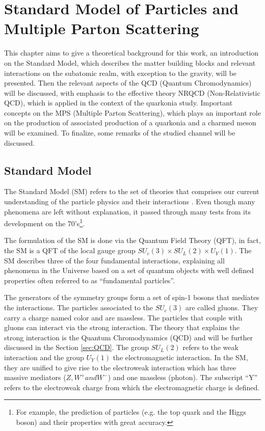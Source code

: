 \chapter{Standard Model of Particles and Multiple Parton Scattering}

This chapter aims to give a theoretical background for this work, an introduction on the Standard Model, which describes the matter building blocks and relevant interactions on the subatomic realm, with exception to the gravity, will be presented. Then the relevant aspects of the QCD (Quantum Chromodynamics) will be discussed, with emphasis to the effective theory NRQCD (Non-Relativistic QCD), which is applied in the context of the quarkonia study. Important concepts on the MPS (Multiple Parton Scattering), which plays an important role on the production of associated production of a quarkonia and a charmed meson will be examined. To finalize, some remarks of the studied channel will be discussed.

\section{Standard Model}

The Standard Model (SM) refers to the set of theories that comprises our current understanding of the particle physics and their interactions \cite{Burgess:2006hbd, perkins_2000}. Even though many phenomena are left without explanation, it passed through many tests from its development on the 70's\footnote{For example, the prediction of particles (e.g. the top quark and the Higgs boson) and their properties with great accuracy.}.

The formulation of the SM is done via the Quantum Field Theory (QFT), in fact, the SM is a QFT of the local gauge group $SU_c(3) \times SU_L(2) \times U_Y(1)$. The SM describes three of the four fundamental interactions, explaining all phenomena in the Universe based on a set of quantum objects with well defined properties often referred to as ``fundamental particles''.

The generators of the symmetry groups form a set of spin-1 bosons that mediates the interactions. The particles associated to the $SU_c(3)$ are called gluons. They carry a charge named color and are massless. The particles that couple with gluons can interact via the strong interaction. The theory that explains the strong interaction is the Quantum Chromodynamics (QCD) and will be further discussed in the Section \ref{sec:QCD}. The group $SU_L(2)$ refers to the weak interaction and the group $U_Y(1)$ the electromagnetic interaction. In the SM, they are unified to give rise to the electroweak interaction which has three massive mediators ($Z, W^+ and W^-$) and one massless (photon). The subscript ``Y'' refers to the electroweak charge from which the electromagnetic charge is defined.


